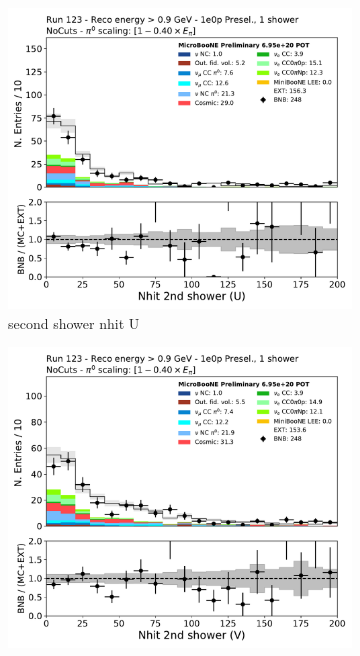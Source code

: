 \begin{figure}[H]
    \centering
    \begin{subfigure}{0.3\textwidth}
    \includegraphics[width=1.0\textwidth]{1e0p/High_E_Sideband/secondshower_U_nhit.pdf}
    \caption{second shower nhit U}
    \end{subfigure}
    \begin{subfigure}{0.3\textwidth}
    \includegraphics[width=1.0\textwidth]{1e0p/High_E_Sideband/secondshower_V_nhit.pdf}

\end{subfigure}
\end{figure}

